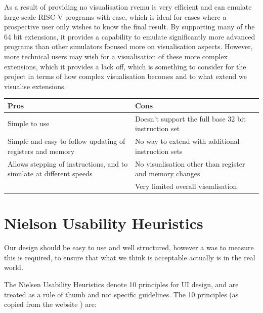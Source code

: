 As a result of providing no visualisation rvemu is very efficient and can emulate large scale RISC-V programs with ease, which is ideal for cases where a prospective user only wishes to know the final result. By supporting many of the 64 bit extensions, it provides a capability to emulate significantly more advanced programs than other simulators focused more on visualisation aspects. However, more technical users may wish for a visualisation of these more complex extensions, which it provides a lack off, which is something to consider for the project in terms of how complex visualisation becomes and to what extend we visualise extensions.

\begin{table}[H]
\begin{tabular}{|p{0.5\linewidth} | p{0.5\linewidth}|}
\hline
\textbf{Pros}                                                        & \textbf{Cons}                                           \\ \hline
Simple to use                                                        & Doesn't support the full base 32 bit instruction set    \\ \hline
Simple and easy to follow updating of registers and memory           & No way to extend with additional instruction sets       \\ \hline
Allows stepping of instructions, and to simulate at different speeds & No visualisation other than register and memory changes \\ \hline
                                                                     & Very limited overall visualisation                      \\ \hline
\end{tabular}
\end{table}

\section{Nielson Usability Heuristics}\label{sec:nielson}
Our design should be easy to use and well structured, however a was to measure this is required, to ensure that what we think is acceptable actually is in the real world.

The Nielsen Usability Heuristics \cite{nielsen_2020_10} denote 10 principles for \ac{UI} design, and are treated as a rule of thumb and not specific guidelines. The 10 principles (as copied from the website \cite{nielsen_2020_10}) are:

